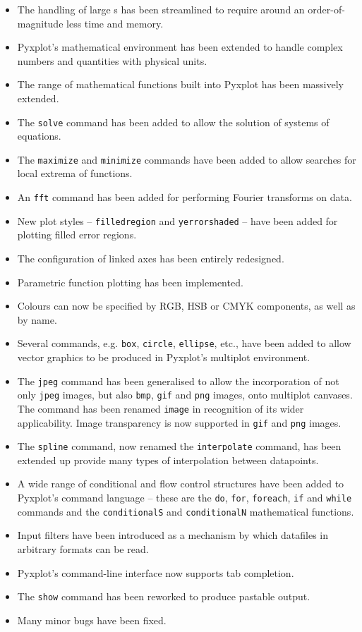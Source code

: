 \begin{itemize}
\item The handling of large \datafile s has been streamlined to require around an order-of-magnitude less time and memory.
\item Pyxplot's mathematical environment has been extended to handle complex numbers and quantities with physical units.
\item The range of mathematical functions built into Pyxplot has been massively extended.
\item The {\tt solve} command has been added to allow the solution of systems of equations.
\item The {\tt maximize} and {\tt minimize} commands have been added to allow searches for local extrema of functions.
\item An {\tt fft} command has been added for performing Fourier transforms on data.
\item New plot styles -- {\tt filledregion} and {\tt yerrorshaded} -- have been added for plotting filled error regions.
\item The configuration of linked axes has been entirely redesigned.
\item Parametric function plotting has been implemented.
\item Colours can now be specified by RGB, HSB or CMYK components, as well as by name.
\item Several commands, e.g. {\tt box}, {\tt circle}, {\tt ellipse}, etc., have been added to allow vector graphics to be produced in Pyxplot's multiplot environment.
\item The {\tt jpeg} command has been generalised to allow the incorporation of not only {\tt jpeg} images, but also {\tt bmp}, {\tt gif} and {\tt png} images, onto multiplot canvases. The command has been renamed {\tt image} in recognition of its wider applicability. Image transparency is now supported in {\tt gif} and {\tt png} images.
\item The {\tt spline} command, now renamed the {\tt interpolate} command, has been extended up provide many types of interpolation between datapoints.
\item A wide range of conditional and flow control structures have been added to Pyxplot's command language -- these are the {\tt do}, {\tt for}, {\tt foreach}, {\tt if} and {\tt while} commands and the {\tt cond\-ition\-alS} and {\tt con\-dition\-alN} mathematical functions.
\item Input filters have been introduced as a mechanism by which datafiles in arbitrary formats can be read.
\item Pyxplot's command-line interface now supports tab completion.
\item The {\tt show} command has been reworked to produce pastable output.
\item Many minor bugs have been fixed.
\end{itemize}

